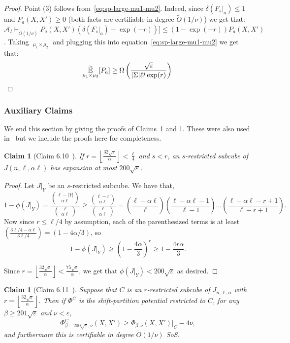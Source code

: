 \documentclass[11pt]{article}
\DeclareMathOperator*{\pE}{\widetilde{\mathbb{E}}}
\def \cA {\mathcal{A}}
\def \tO {\widetilde{O}}
\def \sos {SoS\xspace}
\def \eps {{\varepsilon}}
\newtheorem{claim}[theorem]{Claim}
\theoremstyle{definition}
\begin{document}
\begin{proof}
Point (3) follows from~\eqref{eq:sp-large-mu1-mu2}. Indeed, 
since $\delta(F_s|_a) \leq 1$ and $P_a(X,X') \geq 0$ (both facts are certifiable in degree $\widetilde{O}(1/\nu)$) we get that: $\cA_I \vdash_{\widetilde{O}(1/\nu)} P_{a}(X,X')(\delta(F_s|_a)-\exp(-r))] \leq (1-\exp(-r))P_a(X,X')$. Taking $\pE_{\mu_1 \times \mu_2}$ and plugging this into equation~\eqref{eq:sp-large-mu1-mu2} we get that:
\[\pE_{\mu_1 \times \mu_2}[P_a] \geq \Omega\left(\frac{\sqrt{\eps}}{|\Sigma|\ell^{j}\exp(r)}\right)
\qedhere\]
\end{proof}


\subsubsection{Auxiliary Claims}\label{sec:aux_claims}
We end this section by giving the proofs of Claims~\ref{claim:subcube-expanse} and \ref{claim:potentials}. These were also used in~\cite{BBKSS} but we include the proofs here for completeness.


\begin{claim}[Claim 6.10~\cite{BBKSS}]\label{claim:subcube-expanse}
If $r = \left\lfloor\frac{32\sqrt{\eps}}{\alpha}\right\rfloor < \frac{\ell}{4}$ and $s < r$, an $s$-restricted subcube of $J(n,\ell,\alpha\ell)$ has expansion at most $200\sqrt{\eps}$.
\end{claim}


\begin{proof}
Let $J|_Y$ be an $s$-restricted subcube.
We have that,
\[1 - \phi(J|_Y) = \frac{\binom{\ell - |Y|}{\alpha\ell}}{\binom{\ell}{\alpha\ell}} \geq \frac{\binom{\ell - r}{\alpha\ell}}{\binom{\ell}{\alpha\ell}} = \left(\frac{\ell - \alpha\ell}{\ell}\right)\left(\frac{\ell - \alpha\ell - 1}{\ell - 1}\right)\ldots \left(\frac{\ell - \alpha\ell - r + 1}{\ell - r + 1}\right).\]
Now since $r \leq \ell/4$ by assumption, each of the parenthesized terms is at least $\left(\frac{3\ell/4 - \alpha\ell}{3\ell/4}\right) = (1 - 4\alpha/3)$, so
\[1 - \phi(J|_Y) \geq \left(1-\frac{4\alpha}{3}\right)^r \geq 1 - \frac{4r\alpha}{3}.\]

Since $r = \left\lfloor\frac{32\sqrt{\eps}}{\alpha}\right\rfloor < \frac{75\sqrt{\eps}}{\alpha}$, we get that $\phi(J|_Y) < 200\sqrt{\eps}$
as desired.
\end{proof}


\begin{claim}[Claim 6.11~\cite{BBKSS}]\label{claim:potentials}
Suppose that $C$ is an $r$-restricted subcube of $J_{n,\ell,\alpha}$ with $r = \left\lfloor\frac{32\sqrt{\eps}}{\alpha}\right\rfloor$.
Then if $\Phi^C$ is the shift-partition potential restricted to $C$, for any $\beta \ge 201\sqrt{\eps}$ and $\nu < \eps$,
\[
\Phi^C_{\beta -200\sqrt{\eps},\nu}(X,X') \ge \Phi_{\beta,\nu}(X,X')|_C - 4\nu,
\]
and furthermore this is certifiable in degree $\tO(1/\nu)$ \sos.
\end{claim}
\end{document}
